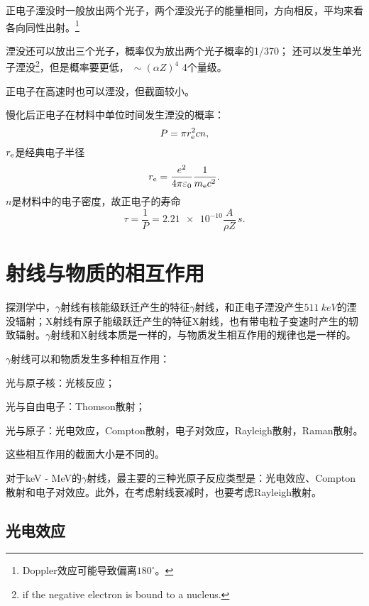 正电子湮没时一般放出两个光子，两个湮没光子的能量相同，方向相反，平均来看各向同性出射。\footnote{Doppler效应可能导致偏离$180^\circ$。}

湮没还可以放出三个光子，概率仅为放出两个光子概率的1/370；
还可以发生单光子湮没\footnote{if the negative electron is bound to a nucleus.}，但是概率要更低，$~\sim(\alpha Z)^4$ 4个量级。

正电子在高速时也可以湮没，但截面较小。

慢化后正电子在材料中单位时间发生湮没的概率：
\[
	P=\pi r_\mathrm e^2cn,
\]
$r_\mathrm e$是经典电子半径
\[
	r_\mathrm e=\frac{e^2}{4\pi\varepsilon_0}\frac1{m_\mathrm e c^2}.
\]
$n$是材料中的电子密度，故正电子的寿命
\[
	\tau=\frac1P=\num{2.21e-10}\frac{A}{\rho Z}\,\si{s}.
\]

\section{\textgamma 射线与物质的相互作用}

探测学中，$\gamma$射线有核能级跃迁产生的特征$\gamma$射线，和正电子湮没产生$\SI{511}{keV}$的湮没辐射；X射线有原子能级跃迁产生的特征X射线，也有带电粒子变速时产生的轫致辐射。$\gamma$射线和X射线本质是一样的，与物质发生相互作用的规律也是一样的。

$\gamma$射线可以和物质发生多种相互作用：
\begin{compactitem}
	\item 光与原子核：光核反应；
	\item 光与自由电子：Thomson散射；
	\item 光与原子：光电效应，Compton散射，电子对效应，Rayleigh散射，Raman散射。
\end{compactitem}
这些相互作用的截面大小是不同的。

对于keV - MeV的$\gamma$射线，最主要的三种光原子反应类型是：光电效应、Compton散射和电子对效应。此外，在考虑射线衰减时，也要考虑Rayleigh散射。

\subsection{光电效应}

